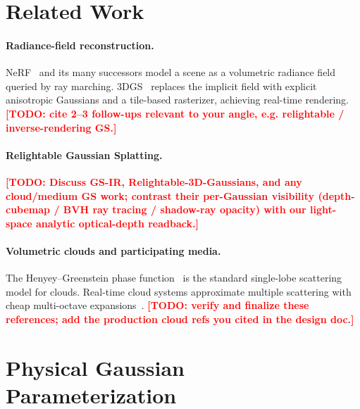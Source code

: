 \documentclass[sigconf]{acmart}
\newcommand{\todo}[1]{\textcolor{red}{\textbf{[TODO: #1]}}}
\begin{document}
\section{Related Work}
\label{sec:related}

\paragraph{Radiance-field reconstruction.}
NeRF~\cite{mildenhall2020nerf} and its many successors model a scene as a
volumetric radiance field queried by ray marching. 3DGS~\cite{kerbl3Dgaussians}
replaces the implicit field with explicit anisotropic Gaussians and a tile-based
rasterizer, achieving real-time rendering. \todo{cite 2--3 follow-ups relevant
to your angle, e.g. relightable / inverse-rendering GS.}

\paragraph{Relightable Gaussian Splatting.}
\todo{Discuss GS-IR, Relightable-3D-Gaussians, and any cloud/medium GS work;
contrast their per-Gaussian visibility (depth-cubemap / BVH ray tracing /
shadow-ray opacity) with our light-space analytic optical-depth readback.}

\paragraph{Volumetric clouds and participating media.}
The Henyey--Greenstein phase function~\cite{henyey1941diffuse} is the standard
single-lobe scattering model for clouds. Real-time cloud systems approximate
multiple scattering with cheap multi-octave
expansions~\cite{wrenninge2013oz, hillenius2016frostbite}. \todo{verify and
finalize these references; add the production cloud refs you cited in the
design doc.}

\section{Physical Gaussian Parameterization}
\label{sec:param}
\end{document}
